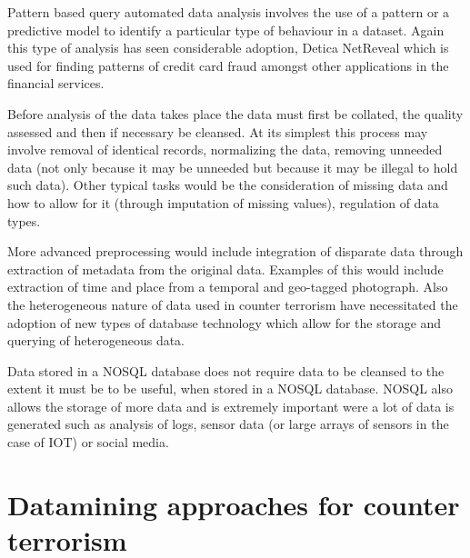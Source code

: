 Pattern based query automated data analysis involves the use of a pattern or a predictive model to identify a particular type of behaviour in a dataset. Again this type of analysis has seen considerable adoption, Detica NetReveal which is used for finding patterns of credit card fraud amongst other applications in the financial services.  

Before analysis of the data takes place the data must first be collated, the quality assessed and then if necessary be cleansed. At its simplest this process may involve removal of identical records, normalizing the data, removing unneeded data (not only because it may be unneeded but because it may be illegal to hold such data). Other typical tasks would be the consideration of missing data and how to allow for it (through imputation of missing values), regulation of data types.

More advanced preprocessing would include integration of disparate data through extraction of metadata from the original data. Examples of this would include extraction of  time and place from a temporal and geo-tagged photograph. Also the heterogeneous nature of data used in counter terrorism have necessitated the adoption of new types of database technology which allow for the storage and querying of heterogeneous data.  

Data stored in a NOSQL database does not require data to be cleansed to the extent it must be to be useful, when stored in a NOSQL database. NOSQL also allows the storage of more data and is extremely important were a lot of data is generated such as analysis of logs, sensor data (or large arrays of sensors in the case of IOT) or social media.

\section{Datamining approaches for counter terrorism}

